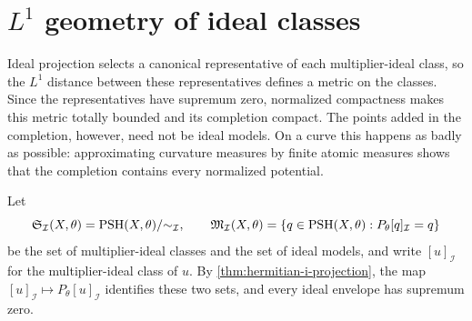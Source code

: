 \section{\texorpdfstring{$L^1$}{L1} geometry of ideal classes}
\label{sec:ideal-lone-completion}

Ideal projection selects a canonical representative of each multiplier-ideal class, so the $L^1$ distance between these representatives defines a metric on the classes. Since the representatives have supremum zero, normalized compactness makes this metric totally bounded and its completion compact. The points added in the completion, however, need not be ideal models. On a curve this happens as badly as possible: approximating curvature measures by finite atomic measures shows that the completion contains every normalized potential.

Let
\[
 \mathfrak S_{\mathcal I}(X,\theta)
       =\mathrm{PSH}(X,\theta)/{\sim_{\mathcal I}},\qquad
 \mathfrak M_{\mathcal I}(X,\theta)
       =\{q\in\mathrm{PSH}(X,\theta):P_\theta[q]_{\mathcal I}=q\}
\]
be the set of multiplier-ideal classes and the set of ideal models, and write $[u]_{\mathcal I}$ for the multiplier-ideal class of $u$. By \cref{thm:hermitian-i-projection}, the map $[u]_{\mathcal I}\mapsto P_\theta[u]_{\mathcal I}$ identifies these two sets, and every ideal envelope has supremum zero.

